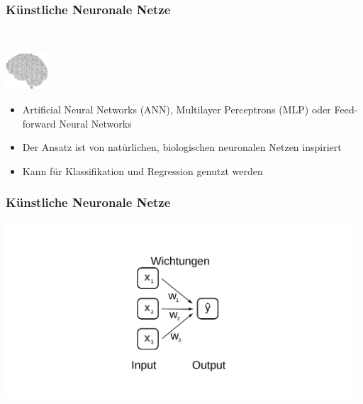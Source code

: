 \documentclass[aspectratio=169]{beamer}
\begin{document}
\begin{frame}
  \frametitle{Künstliche Neuronale Netze}
  \begin{block}{}
    \vspace{0.5cm}
    \ \ \ \
    \begin{minipage}{0.05\textwidth}
      \includegraphics[width=1.6cm]{images/publicdomainvectors_Random-Alphabet-Brain.pdf}
    \end{minipage}
    \hfill
    \begin{minipage}{0.8\textwidth}
      \begin{itemize}
      \item Artificial Neural Networks (ANN), Multilayer Perceptrons
        (MLP) oder Feed-forward Neural Networks
      \item Der Ansatz ist von natürlichen, biologischen neuronalen
        Netzen inspiriert
      \item Kann für Klassifikation und Regression genutzt werden
      \end{itemize}
    \end{minipage}
    \vspace{0.3cm}
  \end{block}
\end{frame}


\begin{frame}
  \frametitle{Künstliche Neuronale Netze}
  \begin{center}    
    \includegraphics[width=13.0cm]{images/ANN_without_hidden_layer.pdf}
  \end{center}  
\end{frame}
\end{document}
